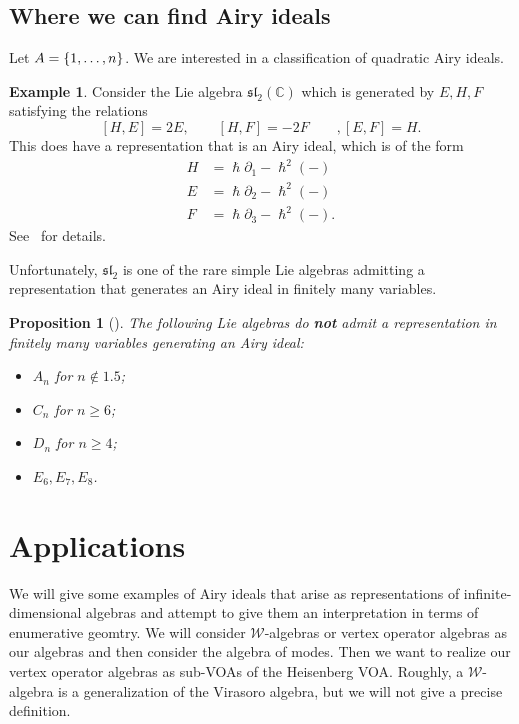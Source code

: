 \documentclass{amsart}
\newtheorem{prop}[thm]{Proposition}
\theoremstyle{definition}
\newtheorem{exm}[thm]{Example}
\theoremstyle{remark}
\theoremstyle{plain}
\theoremstyle{definition}
\theoremstyle{remark}
\newcommand{\C}{\mathbb{C}}
\newcommand{\mc}[1]{\mathcal{#1}}
\newcommand{\mf}[1]{\mathfrak{#1}}
\newcommand{\1}{\mathbf{1}}
\newcommand{\2}{\mathbf{2}}
\newcommand{\3}{\mathbf{3}}
\begin{document}
\subsection{Where we can find Airy ideals}

Let $A = \qty{1, \ldots, n}$. We are interested in a classification of quadratic Airy ideals.

\begin{exm}
    Consider the Lie algebra $\mf{sl}_2(\C)$ which is generated by $E, H, F$ satisfying the relations
    \[ [H, E] = 2E, \qquad [H, F] = -2F \qquad, [E, F] = H. \]
    This does have a representation that is an Airy ideal, which is of the form
    \begin{align*}
        H &= \hslash \partial_1 - \hslash^2(-) \\
        E &= \hslash \partial_2 - \hslash^2(-) \\
        F &= \hslash \partial_3 - \hslash^2(-).
    \end{align*}
    See~\cite{abcdtoprec} for details.
\end{exm}

Unfortunately, $\mf{sl}_2$ is one of the rare simple Lie algebras admitting a representation that generates an Airy ideal in finitely many variables.
\begin{prop}[{\cite[Proposition 6.9]{abcdtoprec}}]
    The following Lie algebras do \textbf{not} admit a representation in finitely many variables generating an Airy ideal:
    \begin{itemize}
        \item $A_n$ for $n \notin \qty{1, 5}$;
        \item $C_n$ for $n \geq 6$;
        \item $D_n$ for $n \geq 4$;
        \item $E_6, E_7, E_8$.
    \end{itemize}
\end{prop}

\section{Applications}

We will give some examples of Airy ideals that arise as representations of infinite-dimensional algebras and attempt to give them an interpretation in terms of enumerative geomtry. We will consider $\mc{W}$-algebras or vertex operator algebras as our algebras and then consider the algebra of modes. Then we want to realize our vertex operator algebras as sub-VOAs of the Heisenberg VOA. Roughly, a $\mc{W}$-algebra is a generalization of the Virasoro algebra, but we will not give a precise definition.
\end{document}
